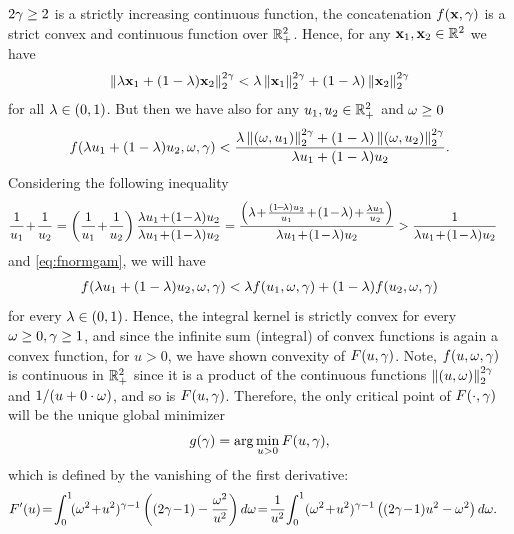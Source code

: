 \documentclass[12pt,onecolumn,final,letterpaper]{IEEEtran}
\begin{document}
  $2\gamma\geq2$ is a strictly increasing continuous function, the concatenation $f({\mathbf x},\gamma)$ is a strict convex and
  continuous function over ${\mathbb R}_+^2$. Hence, for any ${\mathbf x}_1,{\mathbf x}_2\in{\ensuremath{\mathbb R}}^2$ we have
  \begin{align}
     \left\|\lambda{\ensuremath{\mathbf x}}_1+(1-\lambda){\mathbf x}_2\right\| _2^{2\gamma}<\lambda  \left\|{\mathbf x}_1\right\| _2^{2\gamma} + (1-\lambda) \left\|{\mathbf x}_2\right\| _2^{2\gamma}
  \end{align}
  for all $\lambda\in(0,1)$. But then we have also for any $u_1,u_2\in{\ensuremath{\mathbb R}}^2_+$ and $\omega\geq 0$ 
  \begin{align}
    f(\lambda u_1 +(1-\lambda)u_2,\omega,\gamma) < 
    \frac{\lambda \left\|(\omega,u_1)\right\| _2^{2\gamma} + (1-\lambda) \left\|(\omega,u_2)\right\| _2^{2\gamma}}{\lambda u_1+(1-\lambda)u_2}
    \label{eq:fnormgam}.
  \end{align}
  Considering the following inequality 
  \begin{align}
    \frac{1}{u_1}\! +\!\frac{1}{u_2} &=
       \left(\frac{1}{u_1}\! + \!\frac{1}{u_2}\right)\frac{\lam u_1 \!+\!(1\!-\!\lam)u_2}{\lam u_1 \!+\! (1\!-\!\lam)u_2}
       =\frac{ \left(\lam\! +\!\frac{(1\!-\!\lam)u_2}{u_1}\! +\! (1\!-\!\lam) \!+\! \frac{\lam u_1}{u_2}\right)}{\lam
       u_1 \!+\! (1\!-\!\lam)u_2} 
       > \frac{1}{\lam u_1\! +\! (1\!-\!\lam)u_2}\notag
  \end{align}
  and \eqref{eq:fnormgam}, we will have
  \begin{align}
    f(\lambda u_1 +(1-\lambda)u_2,\omega,\gamma) < \lambda f(u_1,\omega,\gamma) + (1-\lambda)f(u_2,\omega,\gamma) 
  \end{align}
  for every $\lambda\in(0,1)$. Hence, the integral kernel is strictly convex for every $\omega\geq0,\gamma\geq 1$, and since the
  infinite sum (integral) of convex functions is again a convex function, for $u>0$, we have shown convexity of $F(u,\gamma)$. 
  Note, $f(u,\omega,\gamma)$ is continuous in ${\mathbb R}_+^2$ since it is a product of the continuous functions
  $ \left\|(u,\omega)\right\| _2^{2\gamma}$ and $1/(u+0\cdot\omega)$, and so is $F(u,\gamma)$. 
  Therefore, the only critical point of $F(\cdot,\gamma)$ will be the unique global minimizer
  \begin{align}
    g(\gamma)=\arg\min_{u>0} F(u,\gamma),
  \end{align}
  which is defined by the  vanishing of the first derivative:
  \begin{align}
    F'(u)  &\!= \!\int_0^{1}\! (\ome^2\!+\!u^2)^{\gam-1} \left( (2\gam\!-\!1)-\frac{\ome^2}{u^2}\right)d\ome
    \!=\!\frac{1}{u^{2}}\!\int_{0}^{1} (\ome^2\!+\!u^2)^{\gam-1}\left((2\gam\!-\!1)u^2-\ome^2\right)d\ome\label{eq:Fderivative}.
  \end{align}
\end{document}
